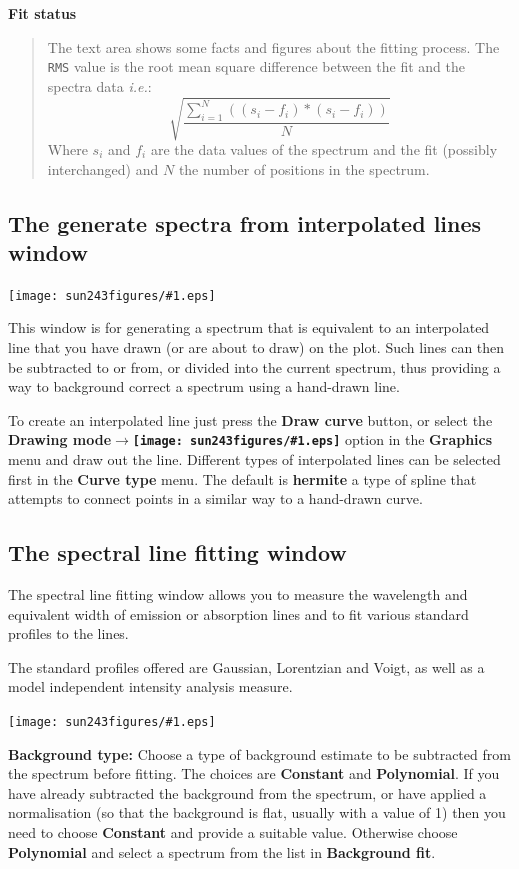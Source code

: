 \documentclass[twoside,11pt]{article}
\newcommand{\htmladdimg}[1]{}
\newcommand{\latexhtml}[2]{#1}
\renewcommand{\_}{\texttt{\symbol{95}}}
\newcommand{\mainfigure}[1]
{\begin{center}
 \latexhtml{\texttt{[image: sun243\_figures/\#1.eps]}}{\htmladdimg{#1.gif}}
 \end{center}
}
\newcommand{\inline}[1]
        {\latexhtml{\texttt{[image: sun243\_figures/\#1.eps]}}
        {\htmladdimg[align=center]{#1.gif}}}
\newcommand{\submenuitem}[2]{\latexhtml{\textbf{#1$\rightarrow$#2}}{\textbf{#1->#2}}}
\newcommand{\labelitem}[1]{\textbf{#1}}
\newcommand{\hitext}[1]{\texttt{#1}}
\newcommand{\ie}{\textit{i.e.}}
\newcommand{\subheading}[1]{\textbf{\large{#1}}}
\begin{document}
\subheading{Fit status}
\begin{quote}
 The \label{Fit status} text area shows some facts and figures about
 the fitting process. The \hitext{RMS} value is the root mean square
 difference between the fit and the spectra data \ie:
 \[
 \displaystyle\sqrt{
    \displaystyle\frac{
       \displaystyle\sum_{i=1}^{N}((s_{i}-f_{i})*(s_{i}-f_{i}))}{N}}
 \]
 Where $s_{i}$ and $f_{i}$ are the data values of the spectrum and the
 fit (possibly interchanged) and $N$ the number of positions in the
 spectrum.
\end{quote}

\newpage
\subsection{The generate spectra from interpolated lines window}

\mainfigure{generateline}

This window is for generating a spectrum that is equivalent to an interpolated
line that you have drawn (or are about to draw) on the plot. Such lines can
then be subtracted to or from, or divided into the current spectrum,
thus providing a way to background correct a spectrum using a hand-drawn line.

To create an interpolated line just press the \labelitem{Draw curve} button,
or select the \submenuitem{Drawing mode}{\inline{curve}} option in the
\labelitem{Graphics} menu and draw out the line.
Different types of interpolated lines can be
selected first in the \labelitem{Curve type} menu. The default is
\labelitem{hermite} a type of spline that attempts to connect points in a
similar way to a hand-drawn curve.

\newpage
\subsection{The spectral line fitting window}

The spectral line fitting window allows you to measure the wavelength
and equivalent width of emission or absorption lines and to fit
various standard profiles to the lines.

The standard profiles offered are Gaussian, Lorentzian and Voigt, as
well as a model independent intensity analysis measure.

\mainfigure{linefitwindow}

\labelitem{Background type:} Choose a type of background estimate to
be subtracted from the spectrum before fitting. The choices are
\labelitem{Constant} and \labelitem{Polynomial}. If you have already
subtracted the background from the spectrum, or have applied a
normalisation (so that the background is flat, usually with a value of
1) then you need to choose \labelitem{Constant} and provide a suitable
value. Otherwise choose \labelitem{Polynomial} and select a spectrum
from the list in \labelitem{Background fit}.
\end{document}
